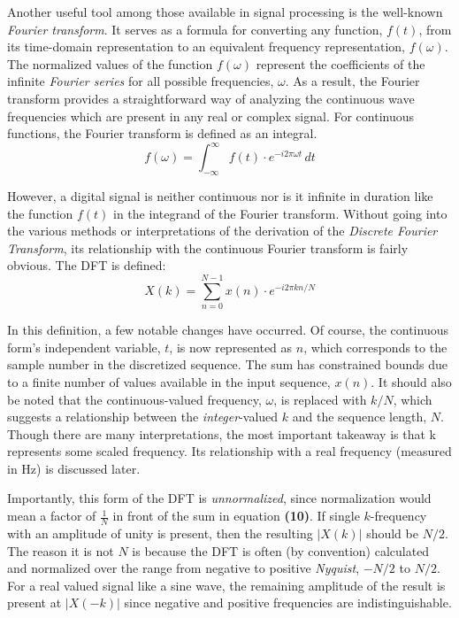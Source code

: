 \documentclass[reprint,amsmath,amssymb]{revtex4-2}
\begin{document}
Another useful tool among those available in signal processing is the well-known \textit{Fourier transform}. It serves as a formula for converting any function, $f(t)$, from its time-domain representation to an equivalent frequency representation, $f(\omega)$. The normalized values of the function $f(\omega)$ represent the coefficients of the infinite \textit{Fourier series} for all possible frequencies, $\omega$. As a result, the Fourier transform provides a straightforward way of analyzing the continuous wave frequencies which are present in any real or complex signal. For continuous functions, the Fourier transform is defined as an integral.
\begin{equation}
    f(\omega) = \int_{-\infty}^\infty f(t)\cdot e^{-i2\pi\omega t} \,dt 
\end{equation}

However, a digital signal is neither continuous nor is it infinite in duration like the function $f(t)$ in the integrand of the Fourier transform. Without going into the various methods or interpretations of the derivation of the \textit{Discrete Fourier Transform}, its relationship with the continuous Fourier transform is fairly obvious. The DFT is defined:
\begin{equation}
    X(k) = \sum_{n=0}^{N-1}{x(n)\cdot e^{-i2\pi kn/N}}
\end{equation}

In this definition, a few notable changes have occurred. Of course, the continuous form's independent variable, $t$, is now represented as $n$, which corresponds to the sample number in the discretized sequence. The sum has constrained bounds due to a finite number of values available in the input sequence, $x(n)$. It should also be noted that the continuous-valued frequency, $\omega$, is replaced with $k/N$, which suggests a relationship between the \textit{integer}-valued $k$ and the sequence length, $N$. Though there are many interpretations, the most important takeaway is that k represents some scaled frequency. Its relationship with a real frequency (measured in Hz) is discussed later. 

Importantly, this form of the DFT is \textit{unnormalized}, since normalization would mean a factor of $\frac{1}{N}$ in front of the sum in equation \textbf{(10)}. If single $k$-frequency with an amplitude of unity is present, then the resulting $|X(k)|$ should be $N/2$. The reason it is not $N$ is because the DFT is often (by convention) calculated and normalized over the range from negative to positive \textit{Nyquist}, $-N/2$ to $N/2$. For a real valued signal like a sine wave, the remaining amplitude of the result is present at $|X(-k)|$ since negative and positive frequencies are indistinguishable.
\end{document}
